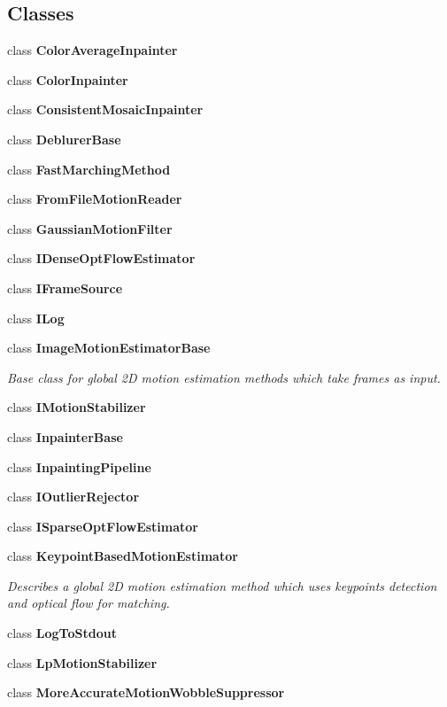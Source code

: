 \subsection*{Classes}
\begin{DoxyCompactItemize}
\item 
class {\bfseries Color\+Average\+Inpainter}
\item 
class {\bfseries Color\+Inpainter}
\item 
class {\bfseries Consistent\+Mosaic\+Inpainter}
\item 
class {\bfseries Deblurer\+Base}
\item 
class {\bfseries Fast\+Marching\+Method}
\item 
class {\bfseries From\+File\+Motion\+Reader}
\item 
class {\bfseries Gaussian\+Motion\+Filter}
\item 
class {\bfseries I\+Dense\+Opt\+Flow\+Estimator}
\item 
class {\bfseries I\+Frame\+Source}
\item 
class {\bfseries I\+Log}
\item 
class {\bfseries Image\+Motion\+Estimator\+Base}
\begin{DoxyCompactList}\small\item\em Base class for global 2D motion estimation methods which take frames as input. \end{DoxyCompactList}\item 
class {\bfseries I\+Motion\+Stabilizer}
\item 
class {\bfseries Inpainter\+Base}
\item 
class {\bfseries Inpainting\+Pipeline}
\item 
class {\bfseries I\+Outlier\+Rejector}
\item 
class {\bfseries I\+Sparse\+Opt\+Flow\+Estimator}
\item 
class {\bfseries Keypoint\+Based\+Motion\+Estimator}
\begin{DoxyCompactList}\small\item\em Describes a global 2D motion estimation method which uses keypoints detection and optical flow for matching. \end{DoxyCompactList}\item 
class {\bfseries Log\+To\+Stdout}
\item 
class {\bfseries Lp\+Motion\+Stabilizer}
\item 
class {\bfseries More\+Accurate\+Motion\+Wobble\+Suppressor}
\item 

\end{DoxyCompactItemize}
